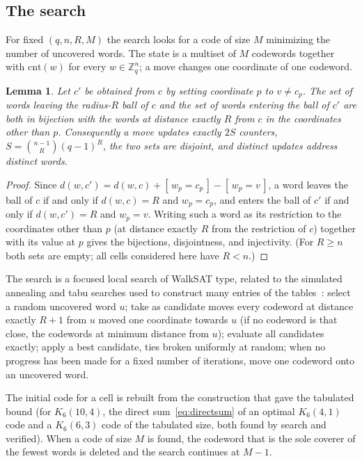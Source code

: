 \documentclass[11pt]{amsart}
\newtheorem{lemma}[theorem]{Lemma}
\newcommand{\Kq}[3]{K_{#1}(#2,#3)}
\newcommand{\Zq}{\mathbb{Z}_q}
\begin{document}
\subsection{The search}\label{sec:ls:search}

For fixed $(q,n,R,M)$ the search looks for a code of size $M$ minimizing
the number of uncovered words. The state is a multiset of $M$ codewords
together with $\mathrm{cnt}(w)$ for every $w\in\Zq^n$; a move changes one
coordinate of one codeword.

\begin{lemma}\label{lem:move}
Let $c'$ be obtained from $c$ by setting coordinate $p$ to $v\ne c_p$. The
set of words leaving the radius-$R$ ball of $c$ and the set of words
entering the ball of $c'$ are both in bijection with the words at distance
exactly $R$ from $c$ in the coordinates other than $p$. Consequently a move
updates exactly $2S$ counters, $S=\binom{n-1}{R}(q-1)^R$, the two sets are
disjoint, and distinct updates address distinct words.
\end{lemma}

\begin{proof}
Since $d(w,c') = d(w,c) + [\,w_p=c_p\,] - [\,w_p=v\,]$, a word leaves the
ball of $c$ if and only if $d(w,c)=R$ and $w_p=c_p$, and enters the ball
of $c'$ if and only if $d(w,c')=R$ and $w_p=v$. Writing such a word as its
restriction to the coordinates other than $p$ (at distance exactly $R$
from the restriction of $c$) together with its value at $p$ gives the
bijections, disjointness, and injectivity. (For $R\ge n$ both sets are
empty; all cells considered here have $R<n$.)
\end{proof}

The search is a focused local search of WalkSAT type, related to the
simulated annealing and tabu searches used to construct many entries of
the tables~\cite{vanLaarhoven,Ostergard}: select a random uncovered word
$u$; take as candidate moves every codeword at distance exactly $R+1$ from
$u$ moved one coordinate towards $u$ (if no codeword is that close, the
codewords at minimum distance from $u$); evaluate all candidates exactly;
apply a best candidate, ties broken uniformly at random; when no progress
has been made for a fixed number of iterations, move one codeword onto an
uncovered word.

The initial code for a cell is rebuilt from the construction that gave the
tabulated bound (for $\Kq{6}{10}{4}$, the direct sum~\eqref{eq:directsum}
of an optimal $\Kq{6}{4}{1}$ code and a $\Kq{6}{6}{3}$ code of the
tabulated size, both found by search and verified). When a code of size
$M$ is found, the codeword that is the sole coverer of the fewest words is
deleted and the search continues at $M-1$.
\end{document}
